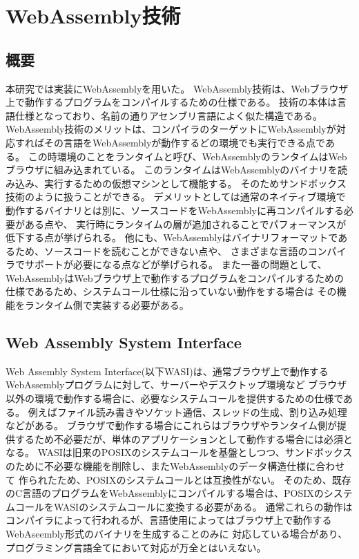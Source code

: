 \documentclass[a4paper,11pt]{jreport}
\begin{document}
\chapter{WebAssembly技術}

\section{概要}

本研究では実装にWebAssemblyを用いた。
WebAssembly技術は、Webブラウザ上で動作するプログラムをコンパイルするための仕様である。
技術の本体は言語仕様となっており、名前の通りアセンブリ言語によく似た構造である。
WebAssembly技術のメリットは、コンパイラのターゲットにWebAssemblyが対応すればその言語をWebAssemblyが動作するどの環境でも実行できる点である。
この時環境のことをランタイムと呼び、WebAssemblyのランタイムはWebブラウザに組み込まれている。
このランタイムはWebAssemblyのバイナリを読み込み、実行するための仮想マシンとして機能する。
そのためサンドボックス技術のように扱うことができる。
デメリットとしては通常のネイティブ環境で動作するバイナリとは別に、ソースコードをWebAssemblyに再コンパイルする必要がある点や、
実行時にランタイムの層が追加されることでパフォーマンスが低下する点が挙げられる。
他にも、WebAssemblyはバイナリフォーマットであるため、ソースコードを読むことができない点や、
さまざまな言語のコンパイラでサポートが必要になる点などが挙げられる。
また一番の問題として、WebAssemblyはWebブラウザ上で動作するプログラムをコンパイルするための仕様であるため、システムコール仕様に沿っていない動作をする場合は
その機能をランタイム側で実装する必要がある。

\section{Web Assembly System Interface}

Web Assembly System Interface(以下WASI)\cite{wasi}は、通常ブラウザ上で動作するWebAssemblyプログラムに対して、サーバーやデスクトップ環境など
ブラウザ以外の環境で動作する場合に、必要なシステムコールを提供するための仕様である。
例えばファイル読み書きやソケット通信、スレッドの生成、割り込み処理などがある。
ブラウザで動作する場合にこれらはブラウザやランタイム側が提供するため不必要だが、単体のアプリケーションとして動作する場合には必須となる。
WASIは旧来のPOSIXのシステムコールを基盤としつつ、サンドボックスのために不必要な機能を削除し、またWebAssemblyのデータ構造仕様に合わせて
作られたため、POSIXのシステムコールとは互換性がない。
そのため、既存のC言語のプログラムをWebAssemblyにコンパイルする場合は、POSIXのシステムコールをWASIのシステムコールに変換する必要がある。
通常これらの動作はコンパイラによって行われるが、言語使用によってはブラウザ上で動作するWebAseembly形式のバイナリを生成することのみに
対応している場合があり、プログラミング言語全てにおいて対応が万全とはいえない。
\end{document}
